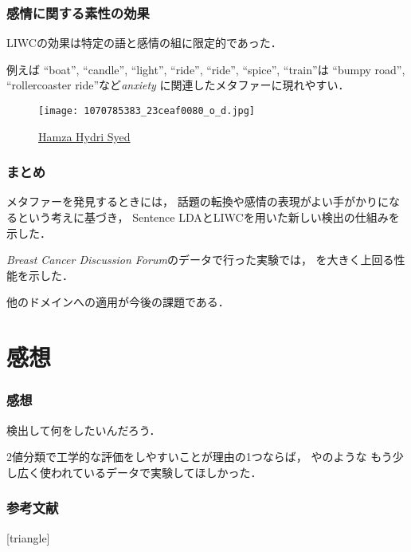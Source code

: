 \documentclass[11pt,usepdftitle=false]{beamer}
\newcommand\papertitle[1]{\textit{#1}}
\let\oldcite=\citet
\renewcommand\citet[1]{\hyperlink{#1}{\oldcite{#1}}}
\begin{document}
\begin{frame}
    \frametitle{感情に関する素性の効果}
    LIWCの効果は特定の語と感情の組に限定的であった．

    例えば “boat”, “candle”, “light”, “ride”, “ride”, “spice”, “train”は
    “bumpy road”, “rollercoaster ride”など\textit{anxiety} に関連したメタファーに現れやすい．

    \smallskip

    \begin{figure}
        \centering
        \texttt{[image: 1070785383\_23ceaf0080\_o\_d.jpg]}
        \captionsetup{font=scriptsize}
        \caption*{\href{https://www.flickr.com/photos/hamzahydri/1070785383/in/photolist-2CC4bX-4nMLfE-quQzzJ-n7xdmk-7VCgsg-5Dfw2A-rgnv34-7xZad-hkCVpY-nVDu4w-pkBdb-ccSrT-5CwjAU-56Yzj1-n7joZ-aeJXkm-4dG7aj-4yipLJ-bmhvns-cBmWT-482gXC-4JCdnm-cXu6bQ-6rPcF9-6iP5h8-2QTJNA-7nSmwL-oe76fW-bpJLcb-2xQoC1-5FVXqf-5dFswx-o9pVMR-Dhdcm-6atNCU-6gq6HR-5fRxQ-8zsuXQ-6Q4vR7-dTPURU-6TjtMQ-5dc9Zt-fcFEPg-5Bxgr6-aBqjXw-6rgEdE-7SJRu-21PL8v-fcFvgF-JhCwnb}{\raisebox{-0.8pt}{\copyright} Hamza Hydri Syed}}
    \end{figure}
\end{frame}

\begin{frame}
    \frametitle{まとめ}
    メタファーを発見するときには，
    話題の転換や感情の表現がよい手がかりになるという考えに基づき，
    Sentence LDAとLIWCを用いた新しい検出の仕組みを示した．

    \papertitle{Breast Cancer Discussion Forum}のデータで行った実験では，
    \citet{jang2015}を大きく上回る性能を示した．

    他のドメインへの適用が今後の課題である．
\end{frame}

\section{感想}
\begin{frame}
    \frametitle{感想}
    検出して何をしたいんだろう．

    2値分類で工学的な評価をしやすいことが理由の1つならば，
    \citet{steen2010}や\citet{tsvetkov2014}のような
    もう少し広く使われているデータで実験してほしかった．



\end{frame}

\begin{frame}[allowframebreaks]
\frametitle{参考文献}
    \scriptsize
    [triangle]
    
    
\end{frame}
\end{document}
